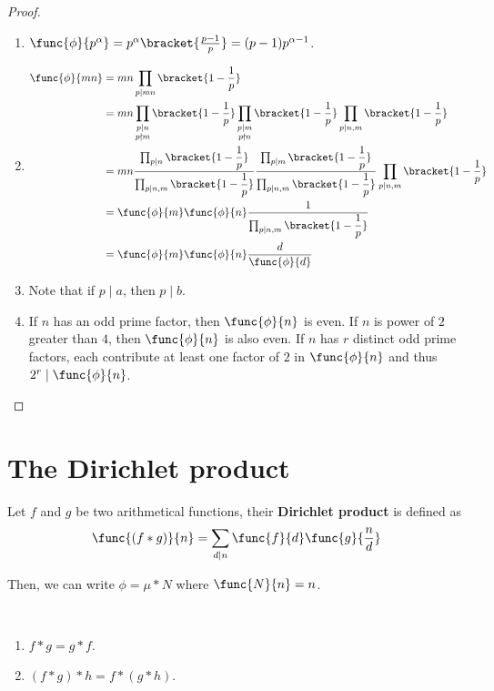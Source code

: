 \begin{proof}
    \ 
    \begin{enumerate}
        \item \(\func{\phi}{p^{\alpha}} = p^{\alpha} \bracket{\frac{p-1}{p}}= (p - 1)p ^{\alpha - 1}\).
        \item 
        \begin{align*}
            \func{\phi}{mn} &= mn \prod_{p \mid mn} \bracket{1 - \dfrac{1}{p}}\\
            &= mn \prod_{\substack{p \mid n \\ p \nmid m}} \bracket{1 - \dfrac{1}{p}} \prod_{\substack{p \mid m \\ p \nmid n}} \bracket{1 - \dfrac{1}{p}} \prod_{p \mid n, m} \bracket{1 - \dfrac{1}{p}} \\
            &= mn \dfrac{\prod_{p \mid n }  \bracket{1 - \dfrac{1}{p}} }{\prod_{p \mid n,m} \bracket{1 - \dfrac{1}{p}}} \dfrac{\prod_{p \mid m }  \bracket{1 - \dfrac{1}{p}} }{\prod_{p \mid n,m} \bracket{1 - \dfrac{1}{p}}}   \prod_{p \mid n,m} \bracket{1 - \dfrac{1}{p}} \\
            &= \func{\phi}{m} \func{\phi}{n} \dfrac{1}{\prod_{p \mid n,m} \bracket{1 - \dfrac{1}{p}}}\\
            &= \func{\phi}{m} \func{\phi}{n} \dfrac{d}{\func{\phi}{d}}
        \end{align*}
        \item Note that if \(p \mid a\), then \(p \mid b\).
        \item If \(n\) has an odd prime factor, then \(\func{\phi}{n}\) is even. If \(n\) is power of \(2\) greater than \(4\), then \(\func{\phi}{n}\) is also even. If \(n\) has \(r\) distinct odd prime factors, each contribute at least one factor of \(2\) in \(\func{\phi}{n}\) and thus \(2^r \mid \func{\phi}{n}\).
    \end{enumerate}
\end{proof}

\section{The Dirichlet product}
\begin{definition}
    Let \(f\) and \(g\) be two arithmetical functions, their \textbf{Dirichlet product} is defined as 
    \begin{equation*}
        \func{(f \ast g)}{n} = \sum_{d \mid n}\func{f}{d} \func{g}{\frac{n}{d}}
    \end{equation*}
\end{definition}
Then, we can write \(\phi = \mu \ast N\) where \(\func{N}{n}  = n\).
\begin{theorem}
    \ 
    \begin{enumerate}
        \item \(f \ast g = g \ast f\).
        \item \((f \ast g) \ast h = f \ast ( g \ast h)\).
    \end{enumerate}
\end{theorem}

